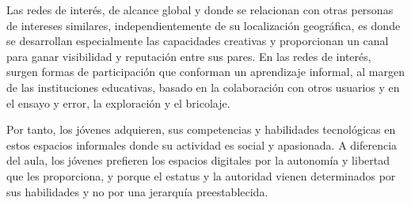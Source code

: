 Las redes de interés, de alcance global y donde se relacionan con otras personas de intereses similares, independientemente de su localización geográfica, es donde se desarrollan especialmente las capacidades creativas y proporcionan un canal para ganar visibilidad y reputación entre sus pares. En las redes de interés, surgen formas de participación que conforman un aprendizaje informal, al margen de las instituciones educativas, basado en la colaboración con otros usuarios y en el ensayo y error, la exploración y el bricolaje. 

Por tanto, los jóvenes adquieren, sus competencias y habilidades tecnológicas en estos espacios informales donde su actividad es social y apasionada. A diferencia del aula, los jóvenes prefieren los espacios digitales por la autonomía y libertad que les proporciona, y porque el estatus y la autoridad vienen determinados por sus habilidades y no por una jerarquía preestablecida\cite{vid09}.



